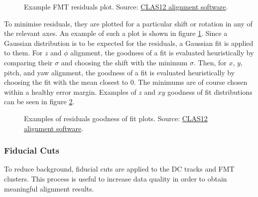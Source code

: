     \begin{figure}[b!]
        \centering{}
        \caption[Example FMT residuals plot]{Example FMT residuals plot.
        Source: \hyperlink{github.com/JeffersonLab/clas12alignment}{CLAS12 alignment software}.}
        \label{fig::res_example}
    \end{figure}

    To minimise residuals, they are plotted for a particular shift or rotation in any of the relevant axes.
    An example of such a plot is shown in figure \ref{fig::res_example}.
    Since a Gaussian distribution is to be expected for the residuals, a Gaussian fit is applied to them.
    For $z$ and $\phi$ alignment, the goodness of a fit is evaluated heuristically by comparing their $\sigma$ and choosing the shift with the minimum $\sigma$.
    Then, for $x$, $y$, pitch, and yaw alignment, the goodness of a fit is evaluated heuristically by choosing the fit with the mean closest to $0$.
    The minimums are of course chosen within a healthy error margin.
    Examples of $z$ and $xy$ goodness of fit distributions can be seen in figure \ref{fig::resfit_example}.

    \begin{figure}[t!]
        \centering{}
        \caption[Examples of residuals goodness of fit plots]{Examples of residuals goodness of fit plots.
        Source: \hyperlink{github.com/JeffersonLab/clas12alignment}{CLAS12 alignment software}.}
        \label{fig::resfit_example}
    \end{figure}

\subsubsection{Fiducial Cuts}
    To reduce background, fiducial cuts are applied to the DC tracks and FMT clusters.
    This process is useful to increase data quality in order to obtain meaningful alignment results.

